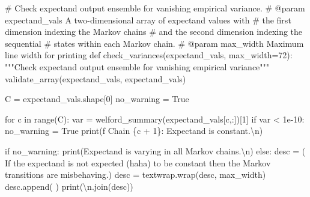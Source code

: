 \documentclass[
  letterpaper,
  DIV=11,
  numbers=noendperiod]{scrartcl}
\newenvironment{Shaded}{\begin{snugshade}}{\end{snugshade}}
\newcommand{\BuiltInTok}[1]{\textcolor[rgb]{0.00,0.23,0.31}{#1}}
\newcommand{\CharTok}[1]{\textcolor[rgb]{0.13,0.47,0.30}{#1}}
\newcommand{\CommentTok}[1]{\textcolor[rgb]{0.37,0.37,0.37}{#1}}
\newcommand{\ControlFlowTok}[1]{\textcolor[rgb]{0.00,0.23,0.31}{#1}}
\newcommand{\DecValTok}[1]{\textcolor[rgb]{0.68,0.00,0.00}{#1}}
\newcommand{\FloatTok}[1]{\textcolor[rgb]{0.68,0.00,0.00}{#1}}
\newcommand{\KeywordTok}[1]{\textcolor[rgb]{0.00,0.23,0.31}{#1}}
\newcommand{\NormalTok}[1]{\textcolor[rgb]{0.00,0.23,0.31}{#1}}
\newcommand{\OperatorTok}[1]{\textcolor[rgb]{0.37,0.37,0.37}{#1}}
\newcommand{\SpecialCharTok}[1]{\textcolor[rgb]{0.37,0.37,0.37}{#1}}
\newcommand{\SpecialStringTok}[1]{\textcolor[rgb]{0.13,0.47,0.30}{#1}}
\newcommand{\StringTok}[1]{\textcolor[rgb]{0.13,0.47,0.30}{#1}}
\newcommand{\VariableTok}[1]{\textcolor[rgb]{0.07,0.07,0.07}{#1}}
\begin{document}
\begin{Shaded}
\begin{Highlighting}[]
\CommentTok{\# Check expectand output ensemble for vanishing empirical variance.}
\CommentTok{\# @param expectand\_vals A two{-}dimensional array of expectand values with}
\CommentTok{\#                       the first dimension indexing the Markov chains}
\CommentTok{\#                       and the second dimension indexing the sequential}
\CommentTok{\#                       states within each Markov chain.}
\CommentTok{\# @param max\_width Maximum line width for printing}
\KeywordTok{def}\NormalTok{ check\_variances(expectand\_vals, max\_width}\OperatorTok{=}\DecValTok{72}\NormalTok{):}
  \CommentTok{"""Check expectand output ensemble for vanishing empirical variance"""}
\NormalTok{  validate\_array(expectand\_vals, }\StringTok{\textquotesingle{}expectand\_vals\textquotesingle{}}\NormalTok{)}
  
\NormalTok{  C }\OperatorTok{=}\NormalTok{ expectand\_vals.shape[}\DecValTok{0}\NormalTok{]}
\NormalTok{  no\_warning }\OperatorTok{=} \VariableTok{True}
  
  \ControlFlowTok{for}\NormalTok{ c }\KeywordTok{in} \BuiltInTok{range}\NormalTok{(C):}
\NormalTok{    var }\OperatorTok{=}\NormalTok{ welford\_summary(expectand\_vals[c,:])[}\DecValTok{1}\NormalTok{]}
    \ControlFlowTok{if}\NormalTok{ var }\OperatorTok{\textless{}} \FloatTok{1e{-}10}\NormalTok{:}
\NormalTok{      no\_warning }\OperatorTok{=} \VariableTok{True}
      \BuiltInTok{print}\NormalTok{(}\SpecialStringTok{f\textquotesingle{}  Chain }\SpecialCharTok{\{}\NormalTok{c }\OperatorTok{+} \DecValTok{1}\SpecialCharTok{\}}\SpecialStringTok{: Expectand is constant.}\CharTok{\textbackslash{}n}\SpecialStringTok{\textquotesingle{}}\NormalTok{)}

  \ControlFlowTok{if}\NormalTok{ no\_warning:}
    \BuiltInTok{print}\NormalTok{(}\StringTok{\textquotesingle{}Expectand is varying in all Markov chains.}\CharTok{\textbackslash{}n}\StringTok{\textquotesingle{}}\NormalTok{)}
  \ControlFlowTok{else}\NormalTok{:}
\NormalTok{    desc }\OperatorTok{=}\NormalTok{ (}\StringTok{\textquotesingle{}  If the expectand is not expected (haha) to be \textquotesingle{}}
            \StringTok{\textquotesingle{}constant then the Markov transitions are misbehaving.\textquotesingle{}}\NormalTok{)}
\NormalTok{    desc }\OperatorTok{=}\NormalTok{ textwrap.wrap(desc, max\_width)}
\NormalTok{    desc.append(}\StringTok{\textquotesingle{} \textquotesingle{}}\NormalTok{)}
    \BuiltInTok{print}\NormalTok{(}\StringTok{\textquotesingle{}}\CharTok{\textbackslash{}n}\StringTok{\textquotesingle{}}\NormalTok{.join(desc))}
\end{Highlighting}
\end{Shaded}
\end{document}
